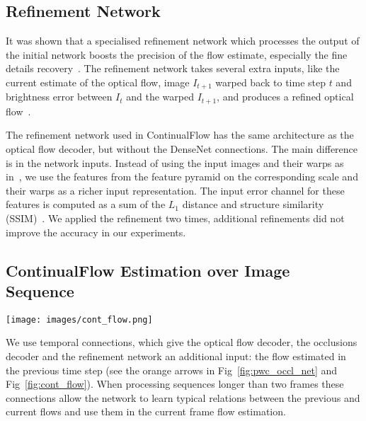 \documentclass[runningheads]{llncs}
\begin{document}
\subsection{Refinement Network}
It was shown that a specialised refinement network which processes the output of the initial network boosts the precision of the flow estimate, especially the fine details recovery~\cite{Ilg2016,Pang2017}.
The refinement network takes several extra inputs, like the current estimate of the optical flow, image $I_{t+1}$ warped back to time step $t$ and brightness error between $I_t$ and the warped $I_{t+1}$, and produces a refined optical flow~\cite{Ilg2016}.

The refinement network used in ContinualFlow has the same architecture as the optical flow decoder, but without the DenseNet connections.
The main difference is in the network inputs.
Instead of using the input images and their warps as in~\cite{Ilg2016}, we use the features from the feature pyramid on the corresponding scale and their warps as a richer input representation.
The input error channel for these features is computed as a sum of the $L_1$ distance and structure similarity (SSIM)~\cite{Wang2004}.
We applied the refinement two times, additional refinements did not improve the accuracy in our experiments.

\subsection{ContinualFlow Estimation over Image Sequence}
\label{sec:cont_flow}
\begin{figure*}[t]
\centering
\texttt{[image: images/cont\_flow.png]}
\caption{Block diagram of ContinualFlow. Feature extractors with shared weights compute a feature pyramid from the input images. Features are input to the optical flow and occlusion decoder and the refinement blocks. The decoder estimates the optical flow and the occlusion map from the input features and from the temporal connection -- the warped optical flow from the previous time step. Optical flow and occlusion maps are finalised by the refinement blocks.}
\label{fig:cont_flow}
\end{figure*}

We use temporal connections, which give the optical flow decoder, the occlusions decoder and the refinement network an additional input: the flow estimated in the previous time step (see the orange arrows in Fig~\ref{fig:pwc_occl_net} and Fig~\ref{fig:cont_flow}).
When processing sequences longer than two frames these connections allow the network to learn typical relations between the previous and current  flows and use them in the current frame flow estimation.
\end{document}
